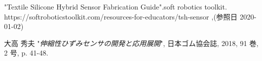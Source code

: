 \pagebreak

\begin{thebibliography}{99}


 "Textile Silicone Hybrid Sensor Fabrication \newline Guide".soft robotics toolkit. \newline https://softroboticstoolkit.com/resources-for-educators/tsh-sensor ,(参照日 2020-01-02)

大高 秀夫 "{\it 伸縮性ひずみセンサの開発と応用展開}", 日本ゴム協会誌, 2018, 91 巻, 2 号, p. 41-48.

\end{thebibliography}